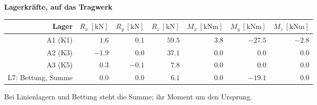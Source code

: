 \documentclass[11pt,a4paper]{article}
\begin{document}
\noindent\textbf{Lagerkräfte, auf das Tragwerk}
\begin{longtable}{rrrrrrr}
\hline
Lager & $R_x\ [\mathrm{kN}]$ & $R_y\ [\mathrm{kN}]$ & $R_z\ [\mathrm{kN}]$ & $M_x\ [\mathrm{kNm}]$ & $M_y\ [\mathrm{kNm}]$ & $M_z\ [\mathrm{kNm}]$ \\
\hline
\endhead
A1 (K1) & $1.6$ & $0.1$ & $59.5$ & $3.8$ & $-27.5$ & $-2.8$ \\
A2 (K3) & $-1.9$ & $0.0$ & $37.1$ & $0.0$ & $0.0$ & $0.0$ \\
A3 (K5) & $0.3$ & $-0.1$ & $7.8$ & $0.0$ & $0.0$ & $0.0$ \\
L7: Bettung, Summe & $0.0$ & $0.0$ & $6.1$ & $0.0$ & $-19.1$ & $0.0$ \\
\hline
\end{longtable}
Bei Linienlagern und Bettung steht die Summe; ihr Moment um den Ursprung.
\end{document}
